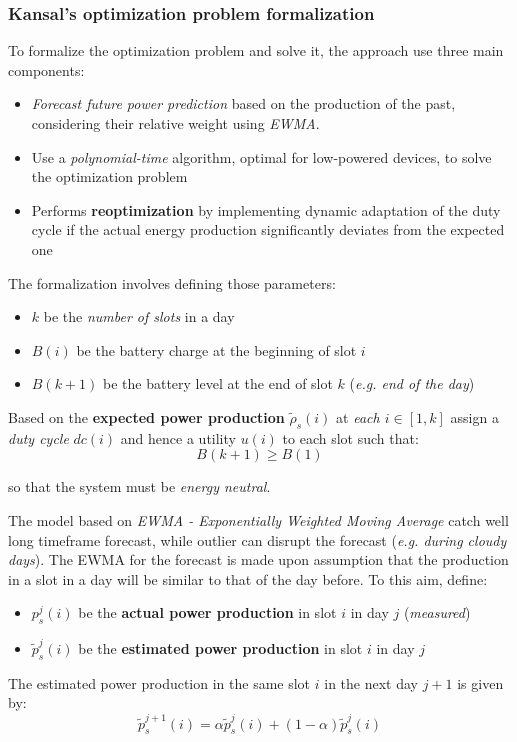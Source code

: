 \documentclass[10pt,a4paper]{report}
\theoremstyle{definition}
\begin{document}
\subsubsection{Kansal's optimization problem formalization}\label{sec:kansals-optimization-problem-formalization}
To formalize the optimization problem and solve it, the approach use three main components:
\begin{itemize}
	\item 
	\textit{Forecast future power prediction} based on the production of the past, considering their relative weight using \textit{EWMA}.
	\item 
	Use a \textit{polynomial-time} algorithm, optimal for low-powered devices, to solve the optimization problem
	\item 
	Performs \textbf{reoptimization} by implementing dynamic adaptation of the duty cycle if the actual energy production significantly deviates from the expected one
\end{itemize}

The formalization involves defining those parameters:
\begin{itemize}
	\item 
	$k$ be the \textit{number of slots} in a day
	\item 
	$B(i)$ be the battery charge at the beginning of slot $i$
	\item 
	$B(k+1)$ be the battery level at the end of slot $k$ (\textit{e.g. end of the day})

\end{itemize}
Based on the \textbf{expected power production} $\tilde{\rho}_{s}(i)$ at \textit{each  $i \in [1,k]$} assign a \textit{duty cycle}  $dc(i)$ and hence a utility $u(i)$ to each slot such that:
\begin{equation}
	B(k+1) \geq B(1)
\end{equation}

so that the system must be \textit{energy neutral}.

The model based on \textit{EWMA - Exponentially Weighted Moving Average} catch well long timeframe forecast, while outlier can disrupt the forecast (\textit{e.g. during cloudy days}). The EWMA for the forecast is made upon assumption that the production in a slot in a day will be similar to that of the day before. To this aim, define:
\begin{itemize}
	\item 
	$p_{s}^{j}(i)$ be the \textbf{actual power production} in slot $i$ in day $j$ (\textit{measured})
	\item 
	$\tilde{p}_{s}^{j}(i)$ be the \textbf{estimated power production} in slot $i$ in day $j$
	
\end{itemize}
The estimated power production in the same slot $i$ in the next day $j+1$ is given by:
\begin{equation}
	\tilde{p}_{s}^{j+1}(i) = \alpha \tilde{p}_{s}^{j}(i) + (1-\alpha)\tilde{p}_{s}^{j}(i)
\end{equation}
\end{document}
